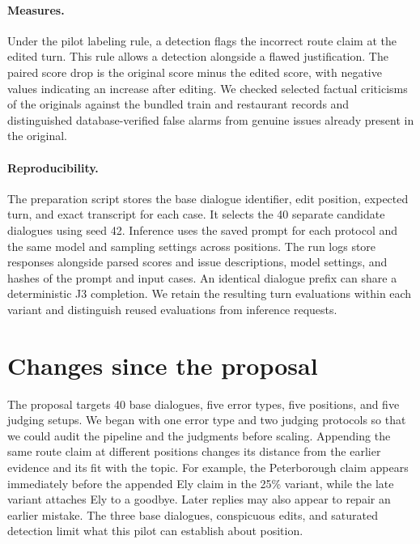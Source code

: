 \documentclass[11pt]{article}
\begin{document}
\paragraph{Measures.}
Under the pilot labeling rule, a detection flags the incorrect route claim at the edited turn. This rule allows a detection alongside a flawed justification. The paired score drop is the original score minus the edited score, with negative values indicating an increase after editing. We checked selected factual criticisms of the originals against the bundled train and restaurant records and distinguished database-verified false alarms from genuine issues already present in the original.

\paragraph{Reproducibility.}
The preparation script stores the base dialogue identifier, edit position, expected turn, and exact transcript for each case. It selects the 40 separate candidate dialogues using seed 42. Inference uses the saved prompt for each protocol and the same model and sampling settings across positions. The run logs store responses alongside parsed scores and issue descriptions, model settings, and hashes of the prompt and input cases. An identical dialogue prefix can share a deterministic J3 completion. We retain the resulting turn evaluations within each variant and distinguish reused evaluations from inference requests.




\section{Changes since the proposal}

The proposal targets 40 base dialogues, five error types, five positions, and five judging setups. We began with one error type and two judging protocols so that we could audit the pipeline and the judgments before scaling. Appending the same route claim at different positions changes its distance from the earlier evidence and its fit with the topic. For example, the Peterborough claim appears immediately before the appended Ely claim in the 25\% variant, while the late variant attaches Ely to a goodbye. Later replies may also appear to repair an earlier mistake. The three base dialogues, conspicuous edits, and saturated detection limit what this pilot can establish about position.
\end{document}

